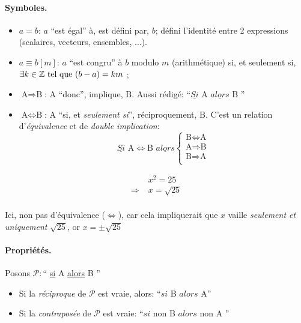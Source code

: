 \documentclass[12pt]{article}
\begin{document}
\paragraph{Symboles.}
\begin{itemize}
    \item[\Ii] $a = b$: $a$ \enquote{est égal} à, est défini par, $b$; 
        défini l'identité entre 2 expressions 
        (scalaires, vecteurs, ensembles, $\dots$).
    \item $a \equiv b \left[m\right]$: 
        $a$ \enquote{est congru} à $b$ modulo $m$ (arithmétique) si, et seulement si,
        $\exists k \in \mathbb{Z} \text{ tel que } (b - a) = km$ ; 
    \item[\Ii] $\text{A} \Rightarrow  \text{B}$: 
        $\text{A}$ \enquote{donc}, implique, $\text{B}$. Aussi rédigé: \enquote{$
            \underline{Si}    \text{ A } 
            \underline{alors} \text{ B } 
        $}
    \item[\Ii] $\text{A} \Leftrightarrow \text{B}$: 
        $\text{A}$ \enquote{si, et \textit{seulement si}}, réciproquement, 
        $\text{B}$. C'est un relation d'\textit{équivalence} 
        et de \textit{double implication}: $$
        \underline{Si} \text{ A} \Leftrightarrow \text{B } \underline{alors}
        \begin{cases}
            \text{B} \Leftrightarrow \text{A} \\
            \text{A} \Rightarrow  \text{B}    \\
            \text{B} \Rightarrow  \text{A}    \\
        \end{cases} $$
\end{itemize}

\Ex $$
\begin{aligned}
    &x^2 = 25 \\
\Rightarrow \; &x = \sqrt{25} \\
\end{aligned}
$$

Ici, non pas d'équivalence ($\Leftrightarrow$), car cela impliquerait que
$x$ vaille \textit{seulement et uniquement} $\sqrt{25}$,
or $x = \pm\sqrt{25}$

\paragraph{Propriétés.} Posons $\mathcal{P}: $\enquote{
    \underline{si} A \underline{alors} B
}
\begin{itemize}
    \item[\Ii] Si la \textit{réciproque} de $\mathcal{P}$ est vraie, alors:
        \enquote{\underline{$si$} B \underline{$alors$} A}
    \item Si la \textit{contraposée} de $\mathcal{P}$ est vraie:  
        \enquote{\underline{$si$} non B \underline{$alors$} non A }
\end{itemize}
\end{document}
